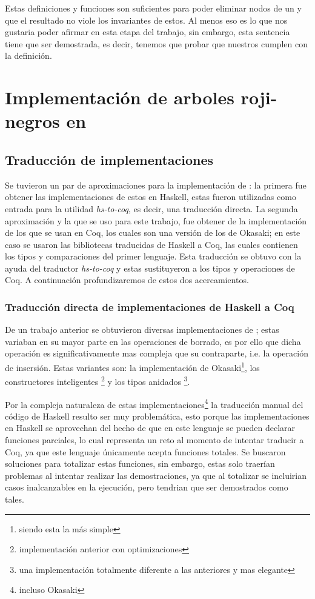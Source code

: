 Estas definiciones y funciones son suficientes para poder eliminar nodos de un {\arn} y que el
resultado no viole los invariantes de estos. Al menos eso es lo que nos gustaria poder afirmar en
esta etapa del trabajo, sin embargo, esta sentencia tiene que ser demostrada, es decir, tenemos que
probar que nuestros {\arns} cumplen con la definición.
\chapter{Implementación de arboles roji-negros en {\coq}}

\section{Traducción de implementaciones}
Se tuvieron un par de aproximaciones para la implementación de {\arns}: la primera fue obtener las
implementaciones de estos \cite{tesisG} en Haskell, estas fueron utilizadas como entrada para la
utilidad \textit{hs-to-coq}, es decir, una traducci\'on directa. La segunda aproximación y la que
se uso para este trabajo, fue obtener de \cite{MSetRBT} la implementaci\'on de los {\arns} que se
usan en Coq, los cuales son una versi\'on de los {\arns} de Okasaki; en este caso se usaron
las bibliotecas traducidas de Haskell a Coq, las cuales contienen los tipos y comparaciones del
primer lenguaje. Esta traducción se obtuvo con la ayuda del traductor \textit{hs-to-coq} y estas
sustituyeron a los tipos y operaciones de Coq. A continuación profundizaremos de estos 
dos acercamientos.

\subsection{Traducción directa de implementaciones de Haskell a Coq}
De un trabajo anterior \cite{tesisG} se obtuvieron diversas implementaciones de {\arns}; estas
variaban en su mayor parte en las operaciones de borrado, es por ello que dicha operación es
significativamente mas compleja que su contraparte, i.e. la operación de insersi\'on. Estas 
variantes son: la implementación de Okasaki\footnote{siendo esta la m\'as simple},
los constructores inteligentes \footnote{implementaci\'on anterior con optimizaciones} y los 
tipos anidados \footnote{una implementaci\'on totalmente diferente a las anteriores y mas elegante}.

Por la compleja naturaleza de estas implementaciones\footnote{incluso Okasaki} la traducción
manual del código de Haskell resulto ser muy problemática, esto porque las implementaciones en
Haskell se aprovechan del hecho de que en este lenguaje se pueden declarar funciones parciales, lo
cual representa un reto al momento de intentar traducir a Coq, ya que este lenguaje únicamente acepta
funciones totales. Se buscaron soluciones para totalizar estas funciones, sin embargo, estas solo
traerían problemas al intentar realizar las demostraciones, ya que al totalizar se incluirian casos
inalcanzables en la ejecuci\'on, pero tendrian que ser demostrados como tales.

